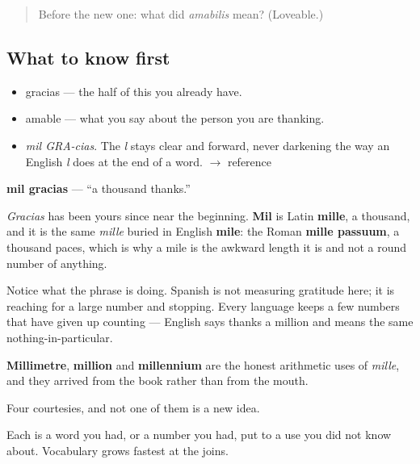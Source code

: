 \label{lesson:ES-C283-mil-gracias}



\begin{quote}
Before the new one: what did \emph{amabilis} mean? (Loveable.)
\end{quote}

\subsection*{What to know first}
\begin{itemize}
\raggedright
  \item gracias — the half of this you already have.
  \item amable — what you say about the person you are thanking.
\end{itemize}

\begin{sounds}
\begin{itemize}
\raggedright
  \item \emph{mil GRA-cias}. The \emph{l} stays clear and forward, never darkening the way an English \emph{l} does at the end of a word. $\to$ reference
\end{itemize}
\end{sounds}

\begin{cousinweb}
\textbf{mil gracias} — \textquotedblleft{}a thousand thanks.\textquotedblright{}

\emph{Gracias} has been yours since near the beginning. \textbf{Mil} is Latin \textbf{mille}, a thousand, and it is the same \emph{mille} buried in English \textbf{mile}: the Roman \textbf{mille passuum}, a thousand paces, which is why a mile is the awkward length it is and not a round number of anything.

Notice what the phrase is doing. Spanish is not measuring gratitude here; it is reaching for a large number and stopping. Every language keeps a few numbers that have given up counting — English says thanks a million and means the same nothing-in-particular.

\textbf{Millimetre}, \textbf{million} and \textbf{millennium} are the honest arithmetic uses of \emph{mille}, and they arrived from the book rather than from the mouth.
\end{cousinweb}

\begin{grammarlens}[title={What you've built}]
Four courtesies, and not one of them is a new idea.

Each is a word you had, or a number you had, put to a use you did not know about. Vocabulary grows fastest at the joins.
\end{grammarlens}

